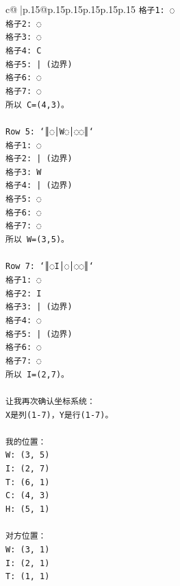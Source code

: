 \documentclass{article}
\begin{document}
{\begin{supertabular}{c@{$\;$}|p{.15\linewidth}@{}p{.15\linewidth}p{.15\linewidth}p{.15\linewidth}p{.15\linewidth}p{.15\linewidth}}
{{{\texttt{格子1: ◌} \\
\texttt{格子2: ◌} \\
\texttt{格子3: ◌} \\
\texttt{格子4: C} \\
\texttt{格子5: | (边界)} \\
\texttt{格子6: ◌} \\
\texttt{格子7: ◌} \\
\texttt{所以 C=(4,3)。} \\
\\ 
\texttt{Row 5: `║◌│W◌│◌◌║`} \\
\texttt{格子1: ◌} \\
\texttt{格子2: | (边界)} \\
\texttt{格子3: W} \\
\texttt{格子4: | (边界)} \\
\texttt{格子5: ◌} \\
\texttt{格子6: ◌} \\
\texttt{格子7: ◌} \\
\texttt{所以 W=(3,5)。} \\
\\ 
\texttt{Row 7: `║◌I│◌│◌◌║`} \\
\texttt{格子1: ◌} \\
\texttt{格子2: I} \\
\texttt{格子3: | (边界)} \\
\texttt{格子4: ◌} \\
\texttt{格子5: | (边界)} \\
\texttt{格子6: ◌} \\
\texttt{格子7: ◌} \\
\texttt{所以 I=(2,7)。} \\
\\ 
\texttt{让我再次确认坐标系统：} \\
\texttt{X是列(1{-}7)，Y是行(1{-}7)。} \\
\\ 
\texttt{我的位置：} \\
\texttt{W: (3, 5)} \\
\texttt{I: (2, 7)} \\
\texttt{T: (6, 1)} \\
\texttt{C: (4, 3)} \\
\texttt{H: (5, 1)} \\
\\ 
\texttt{对方位置：} \\
\texttt{W: (3, 1)} \\
\texttt{I: (2, 1)} \\
\texttt{T: (1, 1)} \\
}}}
\end{supertabular}}
\end{document}

